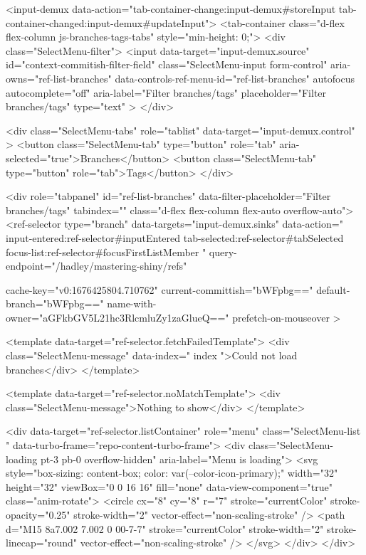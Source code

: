     <input-demux data-action="tab-container-change:input-demux#storeInput tab-container-changed:input-demux#updateInput">
      <tab-container class="d-flex flex-column js-branches-tags-tabs" style="min-height: 0;">
        <div class="SelectMenu-filter">
          <input data-target="input-demux.source"
                 id="context-commitish-filter-field"
                 class="SelectMenu-input form-control"
                 aria-owns="ref-list-branches"
                 data-controls-ref-menu-id="ref-list-branches"
                 autofocus
                 autocomplete="off"
                 aria-label="Filter branches/tags"
                 placeholder="Filter branches/tags"
                 type="text"
          >
        </div>

        <div class="SelectMenu-tabs" role="tablist" data-target="input-demux.control" >
          <button class="SelectMenu-tab" type="button" role="tab" aria-selected="true">Branches</button>
          <button class="SelectMenu-tab" type="button" role="tab">Tags</button>
        </div>

        <div role="tabpanel" id="ref-list-branches" data-filter-placeholder="Filter branches/tags" tabindex="" class="d-flex flex-column flex-auto overflow-auto">
          <ref-selector
            type="branch"
            data-targets="input-demux.sinks"
            data-action="
              input-entered:ref-selector#inputEntered
              tab-selected:ref-selector#tabSelected
              focus-list:ref-selector#focusFirstListMember
            "
            query-endpoint="/hadley/mastering-shiny/refs"
            
            cache-key="v0:1676425804.710762"
            current-committish="bWFpbg=="
            default-branch="bWFpbg=="
            name-with-owner="aGFkbGV5L21hc3RlcmluZy1zaGlueQ=="
            prefetch-on-mouseover
          >

            <template data-target="ref-selector.fetchFailedTemplate">
              <div class="SelectMenu-message" data-index="{{ index }}">Could not load branches</div>
            </template>

              <template data-target="ref-selector.noMatchTemplate">
    <div class="SelectMenu-message">Nothing to show</div>
</template>


            <div data-target="ref-selector.listContainer" role="menu" class="SelectMenu-list " data-turbo-frame="repo-content-turbo-frame">
              <div class="SelectMenu-loading pt-3 pb-0 overflow-hidden" aria-label="Menu is loading">
                <svg style="box-sizing: content-box; color: var(--color-icon-primary);" width="32" height="32" viewBox="0 0 16 16" fill="none" data-view-component="true" class="anim-rotate">
  <circle cx="8" cy="8" r="7" stroke="currentColor" stroke-opacity="0.25" stroke-width="2" vector-effect="non-scaling-stroke" />
  <path d="M15 8a7.002 7.002 0 00-7-7" stroke="currentColor" stroke-width="2" stroke-linecap="round" vector-effect="non-scaling-stroke" />
</svg>
              </div>
            </div>

